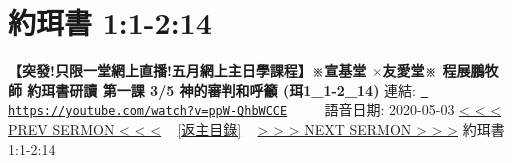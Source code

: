 \documentclass{book}
\begin{document}
\section{約珥書 1:1-2:14}
\label{sec:ppW_QhbWCCE}
\textbf{【突發!只限一堂網上直播!五月網上主日學課程】※宣基堂 $\times$友愛堂※ 程展鵬牧師 約珥書研讀 第一課 3/5 神的審判和呼籲 (珥1\_1-2\_14)}
\newline
\newline
連結: \href{https://youtube.com/watch?v=ppW-QhbWCCE}{\texttt{ https://youtube.com/watch?v=ppW-QhbWCCE}} ~~~~ 語音日期: 2020-05-03 
\newline
\newline
\hyperref[sec:code]{\small{< < < PREV SERMON < < <}}
~
\hyperref[sec:index]{\small{[返主目錄]}}
~
\hyperref[sec:V3TY9OLIKOY]{\small{> > > NEXT SERMON > > >}}
\newline
\newline
約珥書 1:1-2:14
\newline
\end{document}
